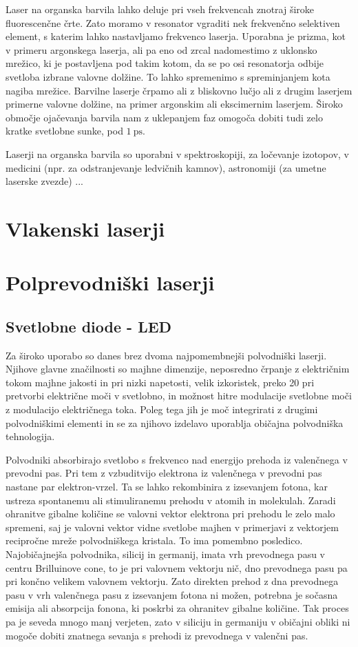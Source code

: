 Laser na organska barvila lahko deluje pri vseh frekvencah znotraj široke
fluorescenčne črte. Zato moramo v resonator vgraditi nek frekvenčno
selektiven element, s katerim lahko nastavljamo frekvenco laserja. Uporabna
je prizma, kot v primeru argonskega laserja, ali pa eno od zrcal nadomestimo 
z uklonsko mrežico, ki je postavljena pod takim kotom, da se po osi resonatorja odbije svetloba
izbrane valovne dolžine. To lahko spremenimo s spreminjanjem kota nagiba mrežice.
Barvilne laserje črpamo ali z bliskovno lučjo ali z drugim laserjem primerne 
valovne dolžine, na primer argonskim ali ekscimernim laserjem. 
Široko območje ojačevanja barvila nam z uklepanjem faz omogoča dobiti
tudi zelo kratke svetlobne sunke, pod $1~\si{\pico\second}$.

Laserji na organska barvila so uporabni v spektroskopiji, za ločevanje izotopov, v 
medicini (npr. za odstranjevanje ledvičnih kamnov), astronomiji (za umetne laserske zvezde) ...
 
\section{Vlakenski laserji}

\section{Polprevodniški laserji}
\subsection{Svetlobne diode - LED}

Za široko uporabo so danes brez dvoma najpomembnejši polvodniški laserji.
Njihove glavne značilnosti so majhne dimenzije, neposredno črpanje z
električnim tokom majhne jakosti in pri nizki napetosti, velik izkoristek,
preko 20%
pri pretvorbi električne moči v svetlobno, in možnost hitre modulacije
svetlobne moči z modulacijo električnega toka. Poleg tega jih je moč
integrirati z drugimi polvodniškimi elementi in se za njihovo izdelavo
uporablja običajna polvodniška tehnologija.

Polvodniki absorbirajo svetlobo s frekvenco nad energijo prehoda iz
valenčnega v prevodni pas. Pri tem z vzbuditvijo elektrona iz valenčnega v
prevodni pas nastane par elektron-vrzel. Ta se lahko rekombinira z
izsevanjem fotona, kar ustreza spontanemu ali stimuliranemu prehodu v atomih
in molekulah. Zaradi ohranitve gibalne količine se valovni vektor elektrona
pri prehodu le zelo malo spremeni, saj je valovni vektor vidne svetlobe
majhen v primerjavi z vektorjem recipročne mreže polvodniškega kristala.
To ima pomembno posledico. Najobičajnejša polvodnika, silicij in germanij,
imata vrh prevodnega pasu v centru Brilluinove cone, to je pri valovnem
vektorju nič, dno prevodnega pasu pa pri končno velikem valovnem vektorju.
Zato direkten prehod z dna prevodnega pasu v vrh valenčnega pasu z
izsevanjem fotona ni možen, potrebna je sočasna emisija ali absorpcija
fonona, ki poskrbi za ohranitev gibalne količine. Tak proces pa je seveda
mnogo manj verjeten, zato v siliciju in germaniju v običajni obliki ni
mogoče dobiti znatnega sevanja s prehodi iz prevodnega v valenčni pas.


